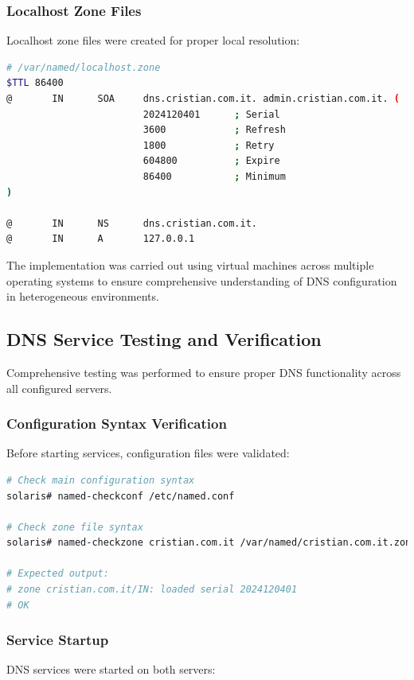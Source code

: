 \documentclass[12pt,a4paper]{article}
\begin{document}
\subsubsection{Localhost Zone Files}
Localhost zone files were created for proper local resolution:

\begin{lstlisting}[language=bash, caption=Localhost Zone Configuration]
# /var/named/localhost.zone
$TTL 86400
@       IN      SOA     dns.cristian.com.it. admin.cristian.com.it. (
                        2024120401      ; Serial
                        3600            ; Refresh
                        1800            ; Retry
                        604800          ; Expire
                        86400           ; Minimum
)

@       IN      NS      dns.cristian.com.it.
@       IN      A       127.0.0.1
\end{lstlisting}

The implementation was carried out using virtual machines across multiple operating systems to ensure comprehensive understanding of DNS configuration in heterogeneous environments.

\subsection{DNS Service Testing and Verification}\label{subsec:dns-testing}

Comprehensive testing was performed to ensure proper DNS functionality across all configured servers.

\subsubsection{Configuration Syntax Verification}
Before starting services, configuration files were validated:

\begin{lstlisting}[language=bash, caption=Configuration Validation]
# Check main configuration syntax
solaris# named-checkconf /etc/named.conf

# Check zone file syntax
solaris# named-checkzone cristian.com.it /var/named/cristian.com.it.zone

# Expected output:
# zone cristian.com.it/IN: loaded serial 2024120401
# OK
\end{lstlisting}

\subsubsection{Service Startup}
DNS services were started on both servers:
\end{document}
